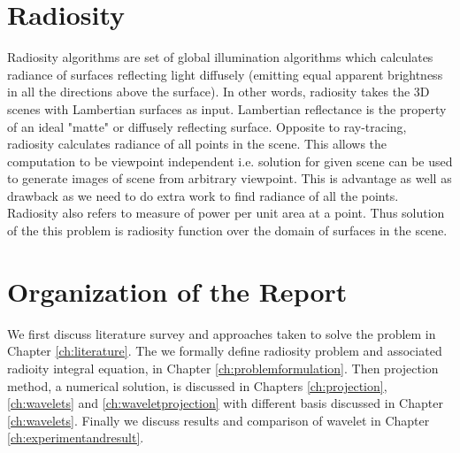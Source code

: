 \section{Radiosity}

Radiosity algorithms are set of global illumination algorithms which calculates radiance of surfaces reflecting light diffusely (emitting equal apparent brightness in all the directions above the surface). In other words, radiosity takes the 3D scenes with Lambertian surfaces as input. Lambertian reflectance is the property of an ideal "matte" or diffusely reflecting surface. Opposite to ray-tracing, radiosity calculates radiance of all points in the scene. This allows the computation to be viewpoint independent i.e. solution for given scene can be used to generate images of scene from arbitrary viewpoint. This is advantage as well as drawback as we need to do extra work to find radiance of all the points. Radiosity also refers to measure of power per unit area at a point. Thus solution of the this problem is radiosity function over the domain of surfaces in the scene. 




\section{Organization of the Report}
We first discuss literature survey and approaches taken to solve the problem in Chapter \ref{ch:literature}. The we formally define radiosity problem and associated radioity integral equation, in Chapter \ref{ch:problemformulation}. Then projection method, a numerical solution, is discussed in Chapters \ref{ch:projection}, \ref{ch:wavelets} and \ref{ch:waveletprojection} with different basis discussed in Chapter \ref{ch:wavelets}. Finally we discuss results and comparison of wavelet in Chapter \ref{ch:experimentandresult}.